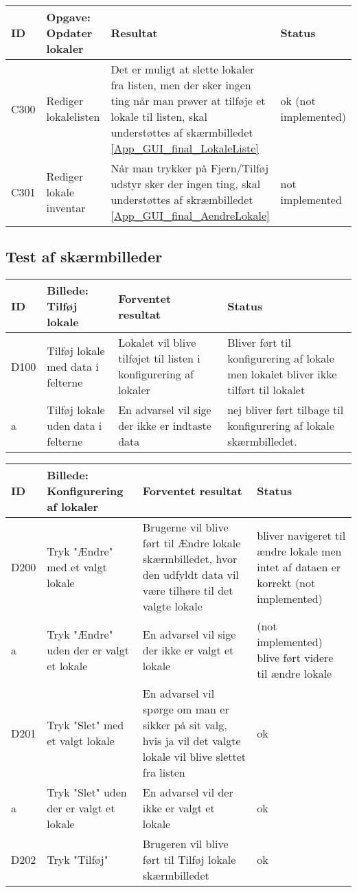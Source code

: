 \begin{tabularx}{\textwidth}{ |X|X|X|X| }
\hline
	ID & Opgave: Opdater lokaler & Resultat & Status\\ 
\hline
	C300 & Rediger lokalelisten & Det er muligt at slette lokaler fra listen, men der sker ingen ting når man prøver at tilføje et lokale til listen, skal understøttes af skærmbilledet \ref{App_GUI_final_LokaleListe} & ok (not implemented) \\
\hline
	C301 & Rediger lokale inventar & Når man trykker på Fjern/Tilføj udstyr sker der ingen ting, skal understøttes af skræmbilledet \ref{App_GUI_final_AendreLokale} & not implemented \\
\hline
\end{tabularx}


\subsection{Test af skærmbilleder}
 \label{App_Test_ListOfTest_ScreenTests}

\begin{tabularx}{\textwidth}{ |X|X|X|X| }
\hline
	ID & Billede: Tilføj lokale  & Forventet resultat & Status\\ 
\hline
	D100 &Tilføj lokale med data i felterne & Lokalet vil blive tilføjet til listen i konfigurering af lokaler & Bliver ført til konfigurering af lokale men lokalet bliver ikke tilført til lokalet \\
\hline
	a & Tilføj lokale uden data i felterne  & En advarsel vil sige der ikke er indtaste data & nej bliver ført tilbage til konfigurering af lokale skærmbilledet. \\
\hline
\end{tabularx}

\begin{tabularx}{\textwidth}{ |X|X|X|X| }
\hline
	ID & Billede: Konfigurering af lokaler & Forventet resultat & Status\\ 
\hline
	D200 & Tryk "Ændre" med et valgt lokale & Brugerne vil blive ført til Ændre lokale skærmbilledet, hvor den udfyldt data vil være tilhøre til det valgte lokale & bliver navigeret til ændre lokale men intet af dataen er korrekt (not implemented) \\
\hline
	a & Tryk "Ændre" uden der er valgt et lokale & En advarsel vil sige der ikke er valgt et lokale & (not implemented) blive ført videre til ændre lokale \\
\hline
	D201 & Tryk "Slet" med et valgt lokale &En advarsel vil spørge om man er sikker på sit valg, hvis ja vil det valgte lokale vil blive slettet fra listen & ok \\
\hline
	a & Tryk "Slet" uden der er valgt et lokale & En advarsel vil der ikke er valgt et lokale & ok \\
\hline
	D202 & Tryk "Tilføj" & Brugeren vil blive ført til Tilføj lokale skærmbilledet & ok\\
\hline
\end{tabularx}

